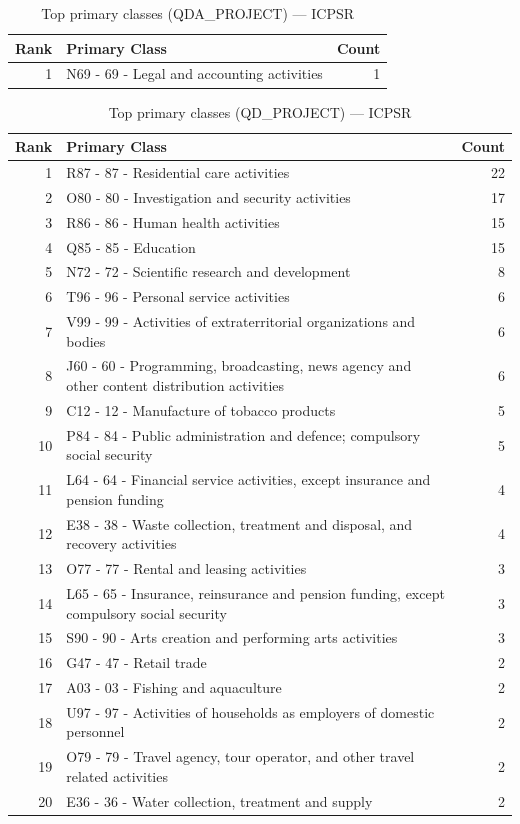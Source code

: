 \begin{table}[H]
    \centering
    \begin{tabular}{r p{10cm} r}
    \hline
    \textbf{Rank} & \textbf{Primary Class} & \textbf{Count} \\
    \hline
    1 & N69 - 69 - Legal and accounting activities & 1 \\
    \hline
    \end{tabular}
    \caption{Top primary classes (QDA\_PROJECT) --- ICPSR}
\end{table}

\begin{table}[H]
    \centering
    \begin{tabular}{r p{10cm} r}
    \hline
    \textbf{Rank} & \textbf{Primary Class} & \textbf{Count} \\
    \hline
    1 & R87 - 87 - Residential care activities & 22 \\
    2 & O80 - 80 - Investigation and security activities & 17 \\
    3 & R86 - 86 - Human health activities & 15 \\
    4 & Q85 - 85 - Education & 15 \\
    5 & N72 - 72 - Scientific research and development & 8 \\
    6 & T96 - 96 - Personal service activities & 6 \\
    7 & V99 - 99 - Activities of extraterritorial organizations and bodies & 6 \\
    8 & J60 - 60 - Programming, broadcasting, news agency and other content distribution activities & 6 \\
    9 & C12 - 12 - Manufacture of tobacco products & 5 \\
    10 & P84 - 84 - Public administration and defence; compulsory social security & 5 \\
    11 & L64 - 64 - Financial service activities, except insurance and pension funding & 4 \\
    12 & E38 - 38 - Waste collection, treatment and disposal, and recovery activities & 4 \\
    13 & O77 - 77 - Rental and leasing activities & 3 \\
    14 & L65 - 65 - Insurance, reinsurance and pension funding, except compulsory social security & 3 \\
    15 & S90 - 90 - Arts creation and performing arts activities & 3 \\
    16 & G47 - 47 - Retail trade & 2 \\
    17 & A03 - 03 - Fishing and aquaculture & 2 \\
    18 & U97 - 97 - Activities of households as employers of domestic personnel & 2 \\
    19 & O79 - 79 - Travel agency, tour operator, and other travel related activities & 2 \\
    20 & E36 - 36 - Water collection, treatment and supply & 2 \\
    \hline
    \end{tabular}
    \caption{Top primary classes (QD\_PROJECT) --- ICPSR}
\end{table}


